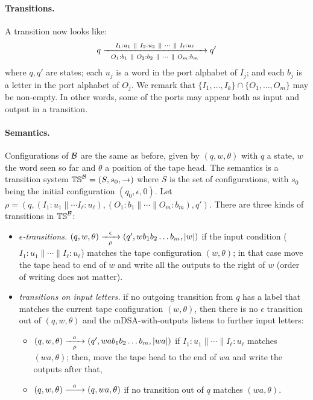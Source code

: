 \paragraph*{Transitions.} A transition now looks like:
\begin{align*}
q \xrightarrow[~~O_1: b_1 ~\parallel~ O_2: b_2 ~\parallel~ \cdots ~\parallel~ O_m: b_m~~]{I_1: u_1 ~\parallel~ I_2: u_2 ~\parallel~ \cdots ~\parallel~ I_\ell: u_\ell} q'
\end{align*}
where $q, q'$ are states; each $u_j$ is a word in the port alphabet of $I_j$; and each $b_j$ is a letter in the port alphabet of $O_j$. We remark that $\{I_1, \dots, I_k\} \cap \{O_1, \dots, O_m\}$ may be non-empty. In other words, some of the ports may appear both as input and output in a transition.  

\paragraph*{Semantics.} Configurations of $\mathcal{B}$ are the same as before, given by $(q, w, \theta)$ with $q$ a state, $w$ the word seen so far and $\theta$ a position of the tape head. The semantics is a transition system $\mathbb{TS}^{\mathcal{B}} = (S, s_0, \xrightarrow{})$ where $S$ is the set of configurations, with $s_0$ being the initial configuration $(q_0, \epsilon, 0)$. Let $\rho = (q, (I_1: u_1 \parallel \cdots I_\ell:u_\ell), (O_1: b_1 \parallel \cdots \parallel O_m: b_m), q')$. There are three kinds of transitions in $\mathbb{TS}^{\mathcal{B}}$:
\begin{itemize}
\item \emph{$\epsilon$-transitions.} $(q, w, \theta) \xrightarrow[\rho]{~~\epsilon~~} (q', wb_1 b_2 \dots b_m, |w|)$ if the input condition ($I_1:u_1 \parallel \cdots \parallel I_\ell:u_\ell$) matches the tape configuration $(w, \theta)$; in that case move the tape head to end of $w$ and write all the outputs to the right of $w$ (order of writing does not matter).
\item \emph{transitions on input letters.} if no outgoing transition from $q$ has a label that  matches the current tape configuration $(w, \theta)$, then there is no $\epsilon$ transition out of $(q, w, \theta)$ and the mDSA-with-outputs listens to further input letters: 
\begin{itemize}
\item $(q, w, \theta) \xrightarrow[\rho]{~~a~~} (q', wab_1 b_2 \dots b_m, |wa|)$ if $I_1:u_1 \parallel \cdots \parallel I_\ell:u_\ell$ matches $(wa, \theta)$; then, move the tape head to the end of $wa$ and write the outputs after that,
\item $(q, w, \theta) \xrightarrow{~~a~~} (q, wa, \theta)$ if no transition out of $q$ matches $(wa, \theta)$.
\end{itemize}
\end{itemize} 
